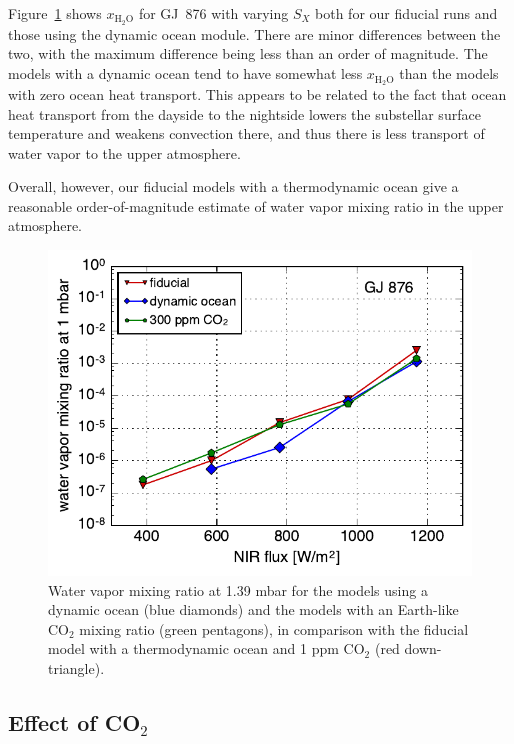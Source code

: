 \documentclass[11pt,numberedappendix,twocolappendix,]{emulateapj}
\def\water{H$_2$O}
\def\xwater{$x_\text{\water}$}
\def\wv{water vapor}
\begin{document}
Figure~\ref{fig:change_ocean} shows \xwater{} for GJ~876 with varying $S_X$ both for our fiducial runs and those using the dynamic ocean module.  
There are minor differences between the two, with the maximum difference being less than an order of magnitude. 
The models with a dynamic ocean tend to have somewhat less \xwater{} than the models with zero ocean heat transport. 
This appears to be related to the fact that ocean heat transport from the dayside to the nightside lowers the substellar surface temperature and weakens convection there, and thus there is less transport of water vapor to the upper atmosphere. 

Overall, however, our fiducial models with a thermodynamic ocean give a reasonable order-of-magnitude estimate of \wv{} mixing ratio in the upper atmosphere. 

\begin{figure}[!h]
    \begin{center}
    \includegraphics[width=0.9\hsize]{xH2O_sensitivity.pdf}
    \end{center}
\caption{Water vapor mixing ratio at 1.39 mbar for the models using a dynamic ocean (blue diamonds) and the models with an Earth-like CO$_2$ mixing ratio (green pentagons), in comparison with the fiducial model with a thermodynamic ocean and 1 ppm CO$_2$ (red down-triangle). }
\label{fig:change_ocean}
\end{figure}

\subsection{Effect of CO$_2$}
\label{ss:sensitivity_CO2}
\end{document}
